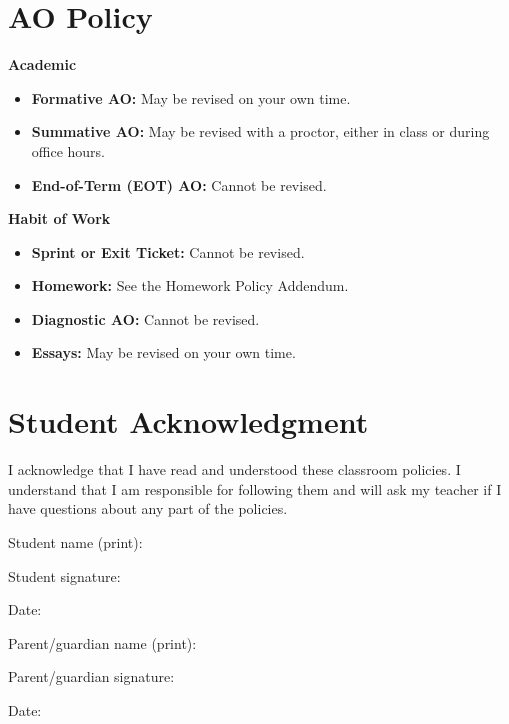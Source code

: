 \documentclass[12pt]{article}
\begin{document}
\section{AO Policy}

\textbf{Academic}
\begin{itemize}
    \item \textbf{Formative AO:} May be revised on your own time.
    \item \textbf{Summative AO:} May be revised with a proctor, either in class or during office hours.
    \item \textbf{End-of-Term (EOT) AO:} Cannot be revised.
\end{itemize}

\textbf{Habit of Work}
\begin{itemize}
    \item \textbf{Sprint or Exit Ticket:} Cannot be revised.
    \item \textbf{Homework:} See the Homework Policy Addendum.
    \item \textbf{Diagnostic AO:} Cannot be revised.
    \item \textbf{Essays:} May be revised on your own time.
\end{itemize}

\section{Student Acknowledgment}

I acknowledge that I have read and understood these classroom policies. I understand that I am responsible for following them and will ask my teacher if I have questions about any part of the policies.

\vspace{2em}

\noindent
Student name (print): \hrulefill

\vspace{2em}

\noindent
Student signature: \hrulefill

\vspace{2em}

\noindent
Date: \hrulefill

\vspace{2em}

\noindent
Parent/guardian name (print): \hrulefill

\vspace{2em}

\noindent
Parent/guardian signature: \hrulefill

\vspace{2em}

\noindent
Date: \hrulefill
\end{document}
